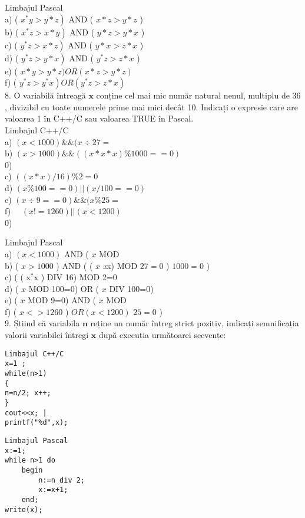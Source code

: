 Limbajul Pascal\\
a) ( $\left.x^{*} y>y * z\right)$ AND ( $x * z>y * z$ )\\
b) ( $\left.x^{*} z>x * y\right)$ AND ( $y * z>y * x$ )\\
c) ( $\left.y^{*} z>x * z\right)$ AND ( $y * x>z * x$ )\\
d) ( $\left.y^{*} z>y * x\right)$ AND ( $y^{*} z>z * x$ )\\
e) ( $x * y>y * z) O R(x * z>y * z)$\\
f) ( $\left.y^{*} z>y^{*} x\right) O R\left(y^{*} z>z * x\right)$\\
8. O variabilă întreagă $\mathbf{x}$ conține cel mai mic număr natural nenul, multiplu de 36 , divizibil cu toate numerele prime mai mici decât 10. Indicați o expresie care are valoarea 1 în C++/C sau valoarea TRUE în Pascal.\\
Limbajul C++/C\\
a) $(x<1000) \& \&(x \div 27=$\\
b) $(x>1000) \& \&((x * x * x) \% 1000==0)$\\
0)\\
c) $((x * x) / 16) \% 2=0$\\
d) $(x \% 100==0)|\mid(x / 100==0)$\\
e) $(x \div 9==0) \& \&(x \% 25=$\\
f) $\quad(x!=1260)|\mid(x<1200)$\\
0)

Limbajul Pascal\\
a) $(x<1000)$ AND ( $x$ MOD\\
b) ( $x>1000$ ) AND ( ( $x$ \textit{x}x) MOD $27=0$ ) $1000=0$ )\\
c) ( ( $\mathrm{x}^{*} \mathrm{x}$ ) DIV 16) MOD 2=0\\
d) ( $x$ MOD 100=0) OR ( $x$ DIV 100=0)\\
e) ( $x$ MOD 9=0) AND ( $x$ MOD\\
f) ( $x<>1260$ ) $O R(x<1200)$ $25=0$ )\\
9. Știind că variabila $\mathbf{n}$ reține un număr întreg strict pozitiv, indicați semnificația valorii variabilei întregi $\mathbf{x}$ după execuția următoarei secvențe:

\begin{verbatim}
Limbajul C++/C
x=1 ;
while(n>1)
{
n=n/2; x++;
}
cout<<x; |
printf("%d",x);
\end{verbatim}

\begin{verbatim}
Limbajul Pascal
x:=1;
while n>1 do
    begin
        n:=n div 2;
        x:=x+1;
    end;
write(x);
\end{verbatim}

